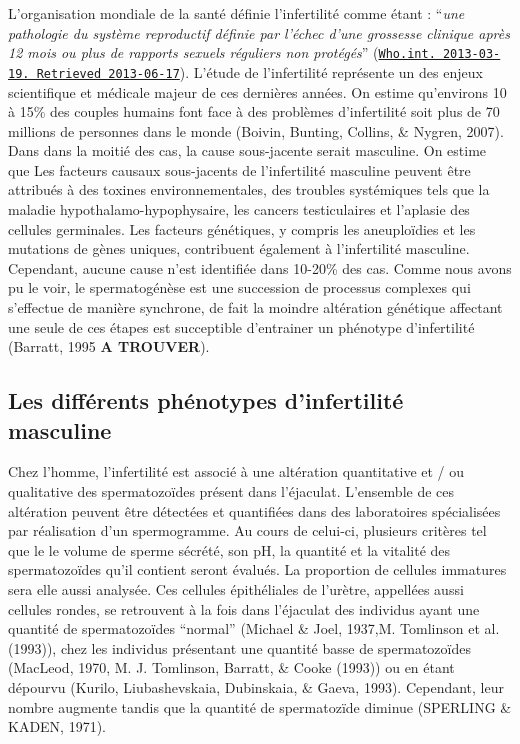 \documentclass[12pt,twoside]{reedthesis}
\theoremstyle{definition}
\theoremstyle{definition}
\theoremstyle{remark}
\begin{document}
  L'organisation mondiale de la santé définie l'infertilité comme étant :
  ``\emph{une pathologie du système reproductif définie par l'échec d'une
  grossesse clinique après 12 mois ou plus de rapports sexuels réguliers
  non protégés}''
  (\href{http://www.who.int/reproductivehealth/topics/infertility/definitions/en/}{\texttt{Who.int.\ 2013-03-19.\ Retrieved\ 2013-06-17}}).
  L'étude de l'infertilité représente un des enjeux scientifique et
  médicale majeur de ces dernières années. On estime qu'environs 10 à 15\%
  des couples humains font face à des problèmes d'infertilité soit plus de
  70 millions de personnes dans le monde (Boivin, Bunting, Collins, \&
  Nygren, 2007). Dans dans la moitié des cas, la cause sous-jacente serait
  masculine. On estime que Les facteurs causaux sous-jacents de
  l'infertilité masculine peuvent être attribués à des toxines
  environnementales, des troubles systémiques tels que la maladie
  hypothalamo-hypophysaire, les cancers testiculaires et l'aplasie des
  cellules germinales. Les facteurs génétiques, y compris les aneuploïdies
  et les mutations de gènes uniques, contribuent également à l'infertilité
  masculine. Cependant, aucune cause n'est identifiée dans 10-20\% des
  cas. Comme nous avons pu le voir, le spermatogénèse est une succession
  de processus complexes qui s'effectue de manière synchrone, de fait la
  moindre altération génétique affectant une seule de ces étapes est
  succeptible d'entrainer un phénotype d'infertilité (Barratt, 1995
  \textbf{A TROUVER}).
  
  \subsection{Les différents phénotypes d'infertilité
  masculine}\label{les-differents-phenotypes-dinfertilite-masculine}
  
  Chez l'homme, l'infertilité est associé à une altération quantitative et
  / ou qualitative des spermatozoïdes présent dans l'éjaculat. L'ensemble
  de ces altération peuvent être détectées et quantifiées dans des
  laboratoires spécialisées par réalisation d'un spermogramme. Au cours de
  celui-ci, plusieurs critères tel que le le volume de sperme sécrété, son
  pH, la quantité et la vitalité des spermatozoïdes qu'il contient seront
  évalués. La proportion de cellules immatures sera elle aussi analysée.
  Ces cellules épithéliales de l'urètre, appellées aussi cellules rondes,
  se retrouvent à la fois dans l'éjaculat des individus ayant une quantité
  de spermatozoïdes ``normal'' (Michael \& Joel, 1937,M. Tomlinson et al.
  (1993)), chez les individus présentant une quantité basse de
  spermatozoïdes (MacLeod, 1970, M. J. Tomlinson, Barratt, \& Cooke
  (1993)) ou en étant dépourvu (Kurilo, Liubashevskaia, Dubinskaia, \&
  Gaeva, 1993). Cependant, leur nombre augmente tandis que la quantité de
  spermatozïde diminue (SPERLING \& KADEN, 1971).
  
\end{document}
